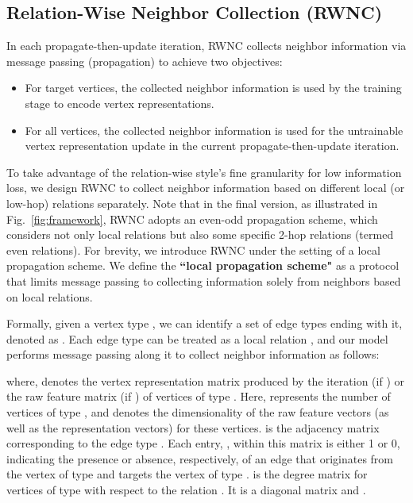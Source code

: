 \documentclass[lettersize,journal]{IEEEtran}
\begin{document}
\subsection{Relation-Wise Neighbor Collection (RWNC)}

In each propagate-then-update iteration, RWNC collects neighbor information via message passing (propagation) to achieve two objectives:
\begin{itemize}
\item For target vertices, the collected neighbor information is used by the training stage to encode vertex representations.
\item For all vertices, the collected neighbor information is used for the untrainable vertex representation update in the current propagate-then-update iteration.
\end{itemize}


To take advantage of the relation-wise style's fine granularity for low information loss, we design RWNC to collect neighbor information based on different local (or low-hop) relations separately.
Note that in the final version, as illustrated in Fig.~\ref{fig:framework}, RWNC adopts an even-odd propagation scheme, which considers not only local relations but also some specific 2-hop relations (termed even relations).
For brevity, we introduce RWNC under the setting of a local propagation scheme.
We define the \textbf{``local propagation scheme"} as a protocol that limits message passing to collecting information solely from neighbors based on local relations.


Formally, given a vertex type , we can identify a set of edge types ending with it, denoted as .
Each edge type  can be treated as a local relation , and our model performs message passing along it to collect neighbor information as follows:

where,  denotes the vertex representation matrix produced by the  iteration (if ) or the raw feature matrix (if ) of vertices of type .
Here,  represents the number of vertices of type , and  denotes the dimensionality of the raw feature vectors (as well as the representation vectors) for these vertices.
 is the adjacency matrix corresponding to the edge type .
Each entry, , within this matrix is either 1 or 0, indicating the presence or absence, respectively, of an edge that originates from the  vertex of type  and targets the  vertex of type .
 is the degree matrix for vertices of type  with respect to the relation .
It is a diagonal matrix and .
\end{document}
